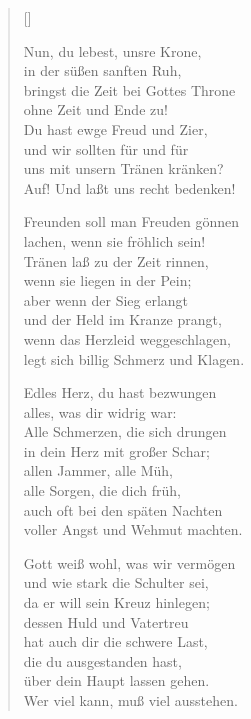 \begin{multicols}{2}
\settowidth{\versewidth}{Freunden soll man Freuden gönnen}
\begin{verse}[\versewidth]

 Nun, du lebest, unsre Krone,\\
in der süßen sanften Ruh,\\
bringst die Zeit bei Gottes Throne\\
ohne Zeit und Ende zu!\\
Du hast ewge Freud und Zier,\\
und wir sollten für und für\\
uns mit unsern Tränen kränken?\\
Auf! Und laßt uns recht bedenken!

 Freunden soll man Freuden gönnen\\
lachen, wenn sie fröhlich sein!\\
Tränen laß zu der Zeit rinnen,\\
wenn sie liegen in der Pein;\\
aber wenn der Sieg erlangt\\
und der Held im Kranze prangt,\\
wenn das Herzleid weggeschlagen,\\
legt sich billig Schmerz und Klagen.

 Edles Herz, du hast bezwungen\\
alles, was dir widrig war:\\
Alle Schmerzen, die sich drungen\\
in dein Herz mit großer Schar;\\
allen Jammer, alle Müh,\\
alle Sorgen, die dich früh,\\
auch oft bei den späten Nachten\\
voller Angst und Wehmut machten.

 Gott weiß wohl, was wir vermögen\\
und wie stark die Schulter sei,\\
da er will sein Kreuz hinlegen;\\
dessen Huld und Vatertreu\\
hat auch dir die schwere Last,\\
die du ausgestanden hast,\\
über dein Haupt lassen gehen.\\
Wer viel kann, muß viel ausstehen.


\end{verse}
\end{multicols}
